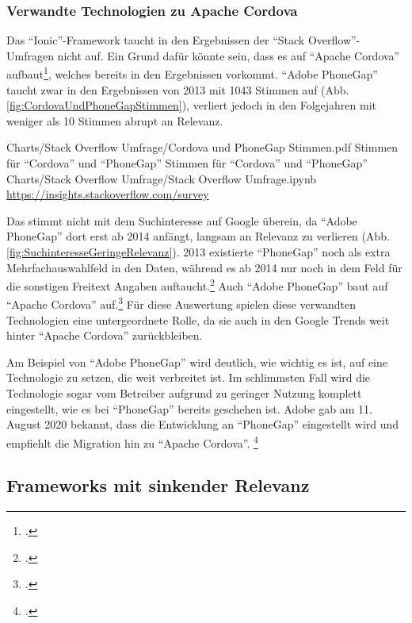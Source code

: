 \subsubsection{Verwandte Technologien zu Apache Cordova} Das \enquote{Ionic}-Framework taucht in den Ergebnissen der \enquote{Stack Overflow}-Umfragen nicht auf.
Ein Grund dafür könnte sein, dass es auf \enquote{Apache Cordova} aufbaut\footcite[Vgl.][]{TheLastWordOnCordovaAndPhoneGap}, welches bereits in den Ergebnissen vorkommt.
\enquote{Adobe PhoneGap} taucht zwar in den Ergebnissen von 2013 mit 1043 Stimmen auf (Abb. \ref{fig:CordovaUndPhoneGapStimmen}),
verliert jedoch in den Folgejahren mit weniger als 10 Stimmen abrupt an Relevanz.
\begin{alexfigurewithnotebook}{Charts/Stack Overflow Umfrage/Cordova und PhoneGap Stimmen.pdf}
	{Stimmen für \enquote{Cordova} und \enquote{PhoneGap}}
	{Stimmen für \enquote{Cordova} und \enquote{PhoneGap}}
	{Charts/Stack Overflow Umfrage/Stack Overflow Umfrage.ipynb}
	{\url{https://insights.stackoverflow.com/survey}}
	\label{fig:CordovaUndPhoneGapStimmen}

\end{alexfigurewithnotebook}

Das stimmt nicht mit dem Suchinteresse auf Google überein, da \enquote{Adobe PhoneGap} dort erst ab 2014 anfängt,
langsam an Relevanz zu verlieren (Abb. \ref{fig:SuchinteresseGeringeRelevanz}).
2013 existierte \enquote{PhoneGap} noch als extra Mehrfachauswahlfeld in den Daten, während es ab 2014 nur noch in dem Feld für die sonstigen Freitext Angaben auftaucht.\footcite[Vgl.][]{StackOverflowInsights}
Auch \enquote{Adobe PhoneGap} baut auf \enquote{Apache Cordova} auf.\footcite[Vgl.][]{FaqPhoneGapDocs}
Für diese Auswertung spielen diese verwandten Technologien eine untergeordnete Rolle, da sie auch in den Google Trends weit hinter \enquote{Apache Cordova} zurückbleiben.

Am Beispiel von \enquote{Adobe PhoneGap} wird deutlich, wie wichtig es ist, auf eine Technologie zu setzen, die weit verbreitet ist.
Im schlimmsten Fall wird die Technologie sogar vom Betreiber aufgrund zu geringer Nutzung komplett eingestellt, wie es bei \enquote{PhoneGap} bereits geschehen ist.
Adobe gab am 11.
August 2020 bekannt, dass die  Entwicklung an \enquote{PhoneGap} eingestellt wird und empfiehlt die Migration hin zu \enquote{Apache Cordova}.  \footcite[Vgl.][]{UpdateForCustomersUsingPhoneGapAndPhoneGapBuild}

\subsection{Frameworks mit sinkender Relevanz}

